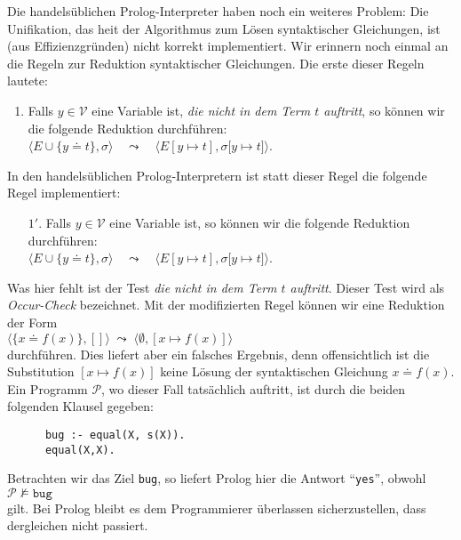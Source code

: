 Die handels\"{u}blichen Prolog-Interpreter haben noch ein weiteres Problem: Die Unifikation,
das hei\3t der Algorithmus zum L\"{o}sen syntaktischer Gleichungen, ist (aus Effizienzgr\"{u}nden)
nicht korrekt implementiert.  Wir erinnern noch einmal an die Regeln zur Reduktion
syntaktischer Gleichungen.  Die erste dieser Regeln lautete:
\begin{enumerate}
\item Falls $y\in\mathcal{V}$ eine Variable ist, {\em die nicht in dem Term $t$ auftritt}, so
      k\"{o}nnen wir die folgende Reduktion durchf\"{u}hren: \\[0.1cm]
      \hspace*{2.1cm} $\Big\langle E \cup \big\{ y \doteq t \big\}, \sigma \Big\rangle \quad\leadsto\quad \Big\langle E[y \mapsto t], \sigma\big[ y \mapsto t \big] \Big\rangle$.
\end{enumerate}
In den handels\"{u}blichen Prolog-Interpretern ist statt dieser Regel die folgende Regel
implementiert:
\begin{enumerate}
\item[$1'$.] Falls $y\in\mathcal{V}$ eine Variable ist, so
      k\"{o}nnen wir die folgende Reduktion durchf\"{u}hren: \\[0.1cm]
      \hspace*{2.1cm} $\Big\langle E \cup \big\{ y \doteq t \big\}, \sigma \Big\rangle \quad\leadsto\quad \Big\langle E[y \mapsto t], \sigma\big[ y \mapsto t \big] \Big\rangle$.
\end{enumerate}
Was hier fehlt ist der Test {\em die nicht in dem Term $t$ auftritt}.  Dieser Test
wird als \emph{Occur-Check} bezeichnet.  Mit der modifizierten Regel k\"{o}nnen wir eine
Reduktion der Form
\\[0.1cm]
\hspace*{1.3cm} $\langle \{ x \doteq f(x) \}, [] \rangle \;\leadsto\; \langle \emptyset, [ x \mapsto f(x) ] \rangle$ \\[0.1cm]
durchf\"{u}hren.  Dies liefert aber ein falsches Ergebnis, denn offensichtlich ist die Substitution 
$[x \mapsto f(x)]$ keine L\"{o}sung der syntaktischen Gleichung $x \doteq f(x)$.  
Ein  Programm $\mathcal{P}$, wo dieser Fall tats\"{a}chlich auftritt, ist durch die beiden folgenden Klausel gegeben: 
\begin{verbatim}
      bug :- equal(X, s(X)).
      equal(X,X).
\end{verbatim}
Betrachten wir das Ziel \texttt{bug}, so liefert Prolog hier die Antwort ``\texttt{yes}'', obwohl \\[0.1cm]
\hspace*{1.3cm} $\mathcal{P} \not\models \mathtt{bug}$ \\[0.1cm]
gilt.
Bei Prolog bleibt es dem Programmierer \"{u}berlassen sicherzustellen, dass dergleichen nicht 
passiert.

